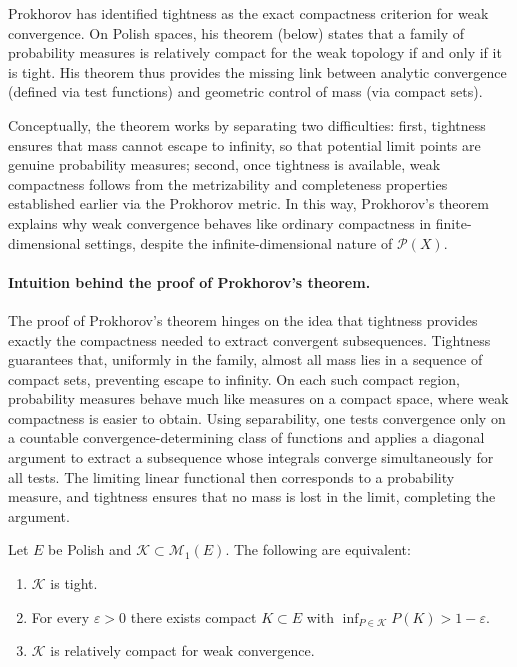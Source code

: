Prokhorov has identified tightness as the exact compactness criterion for weak convergence.
On Polish spaces, his theorem (below) states that a family of probability measures is relatively compact for the weak topology if and only if it is tight.
His theorem thus provides the missing link between analytic convergence (defined via test functions) and geometric control of mass (via compact sets).

\medskip


Conceptually, the theorem works by separating two difficulties:
first, tightness ensures that mass cannot escape to infinity, so that potential limit points are genuine probability measures;
second, once tightness is available, weak compactness follows from the metrizability and completeness properties established earlier via the Prokhorov metric.
In this way, Prokhorov’s theorem explains why weak convergence behaves like ordinary compactness in finite-dimensional settings, despite the infinite-dimensional nature of $\mathcal{P}(X)$.




\paragraph{Intuition behind the proof of Prokhorov’s theorem.}
The proof of Prokhorov’s theorem hinges on the idea that tightness provides exactly the compactness needed to extract convergent subsequences.
Tightness guarantees that, uniformly in the family, almost all mass lies in a sequence of compact sets, preventing escape to infinity.
On each such compact region, probability measures behave much like measures on a compact space, where weak compactness is easier to obtain.
Using separability, one tests convergence only on a countable convergence-determining class of functions and applies a diagonal argument to extract a subsequence whose integrals converge simultaneously for all tests.
The limiting linear functional then corresponds to a probability measure, and tightness ensures that no mass is lost in the limit, completing the argument.

\begin{theorem}
\label{thm:prokhorov}
Let $E$ be Polish and $\mathcal{K}\subset\mathcal{M}_1(E)$. The following are equivalent:
\begin{enumerate}[label=(\alph*)]
\item $\mathcal{K}$ is tight.
\item For every $\varepsilon>0$ there exists compact $K\subset E$ with $\inf_{P\in\mathcal{K}}P(K)>1-\varepsilon$.
\item $\mathcal{K}$ is relatively compact for weak convergence.
\end{enumerate}
\end{theorem}

